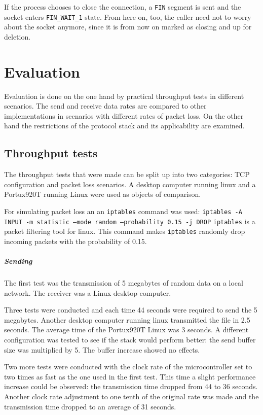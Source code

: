 \documentclass[11pt,twoside,abstract,notitlepage]{scrreprt}
\begin{document}
If the process chooses to close the connection, a \texttt{FIN} segment is sent and the socket enters \texttt{FIN\_WAIT\_1} state. From here on, too, the caller need not to worry about the socket anymore, since it is from now on marked as closing and up for deletion.

\chapter{Evaluation} 
Evaluation is done on the one hand by practical throughput tests in different scenarios. The send and receive data rates are compared to other implementations in scenarios with different rates of packet loss. On the other hand the restrictions of the protocol stack and its applicability are examined. 

\section{Throughput tests}
The throughput tests that were made can be split up into two categories: TCP configuration and packet loss scenarios. A desktop computer running linux and a Portux920T running Linux were used as objects of comparison. 

For simulating packet loss an an \texttt{iptables} command was used: \break
\texttt{iptables -A INPUT -m statistic --mode random --probability 0.15 -j DROP} \break
\texttt{iptables} is a packet filtering tool for linux. This command makes \texttt{iptables} randomly drop incoming packets with the probability of 0.15. 

\paragraph{Sending}
The first test was the transmission of 5 megabytes of random data on a local network. The receiver was a Linux desktop computer.

Three tests were conducted and each time 44 seconds were required to send the 5 megabytes. Another desktop computer running linux transmitted the file in 2.5 seconds. The average time of the Portux920T Linux was 3 seconds. A different configuration was tested to see if the stack would perform better: the send buffer size was multiplied by 5. The buffer increase showed no effects. 

Two more tests were conducted with the clock rate of the microcontroller set to two times as fast as the one used in the first test. This time a slight performance increase could be observed: the transmission time dropped from 44 to 36 seconds. Another clock rate adjustment to one tenth of the original rate was made and the transmission time dropped to an average of 31 seconds.
\end{document}

